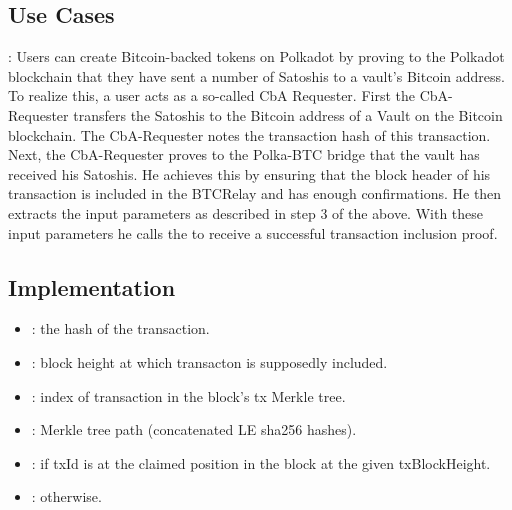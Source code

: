 \documentclass[letterpaper,10pt,english]{sphinxmanual}
\begin{document}
\subsection{Use Cases}
\label{\detokenize{functions:use-cases}}
: Users can create Bitcoin-backed tokens on Polkadot by proving to the Polkadot blockchain that they have sent a number of Satoshis to a vault’s Bitcoin address. To realize this, a user acts as a so-called CbA Requester. First the CbA-Requester transfers the Satoshis to the Bitcoin address of a Vault on the Bitcoin blockchain. The CbA-Requester notes the transaction hash of this transaction. Next, the CbA-Requester proves to the Polka-BTC bridge that the vault has received his Satoshis. He achieves this by ensuring that the block header of his transaction is included in the BTCRelay and has enough confirmations. He then extracts the input parameters as described in step 3 of the {\hyperref[\detokenize{functions:process}]{}} above. With these input parameters he calls the  to receive a successful transaction inclusion proof.


\subsection{Implementation}
\label{\detokenize{functions:implementation}}


\begin{itemize}
\item {} 
: the hash of the transaction.

\item {} 
: block height at which transacton is supposedly included.

\item {} 
: index of transaction in the block’s tx Merkle tree.

\item {} 
: Merkle tree path (concatenated LE sha256 hashes).

\end{itemize}

\begin{itemize}
\item {} 
: if txId is at the claimed position in the block at the given txBlockHeight.

\item {} 
: otherwise.

\end{itemize}
\end{document}
